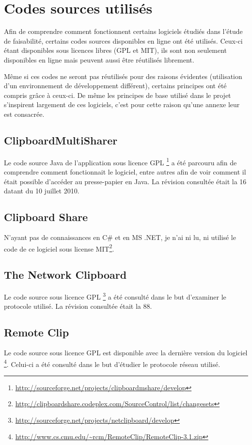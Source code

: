 \chapter{Codes sources utilisés}\label{ann:src}
\renewcommand{\leftmark}{ANNEXE \thechapter.~~Codes sources utilisés}
\label{annexe1}

Afin de comprendre comment fonctionnent certains logiciels étudiés dans
l'étude de faisabilité, certains codes sources disponibles en ligne
ont été utilisés. Ceux-ci étant disponibles sous licences libres (GPL et MIT),
ils sont non seulement disponibles en ligne mais peuvent aussi être
réutilisés librement.

Même si ces codes ne seront pas réutilisés pour des raisons évidentes
(utilisation d'un environnement de développement différent), certains
principes ont été compris grâce à ceux-ci. De même les principes de base
utilisé dans le projet s'inspirent largement de ces logiciels, c'est pour
cette raison qu'une annexe leur est consacrée.

\section*{ClipboardMultiSharer}
Le code source Java de l'application sous licence GPL
\footnote{\url{http://sourceforge.net/projects/clipboardmshare/develop}}
a été parcouru afin de comprendre comment fonctionnait
le logiciel, entre autres afin de voir comment il était possible d'accéder
au presse-papier en Java.
La révision consultée était la 16 datant du 10 juillet 2010.

\section*{Clipboard Share}
N'ayant pas de connaissances en C\# et en MS .NET, je n'ai ni lu, ni utilisé
le code de ce logiciel sous license MIT\footnote{\url{http://clipboardshare.codeplex.com/SourceControl/list/changesets}}.

\section*{The Network Clipboard}
Le code source sous licence GPL
\footnote{\url{http://sourceforge.net/projects/netclipboard/develop}}
a été consulté dans le but d'examiner le protocole utilisé. La révision
consultée était la 88.

\section*{Remote Clip}
Le code source sous licence GPL est disponible avec la dernière version
du logiciel
\footnote{\url{http://www.cs.cmu.edu/~rcm/RemoteClip/RemoteClip-3.1.zip}}.
Celui-ci a été consulté dans le but d'étudier le protocole réseau utilisé.

